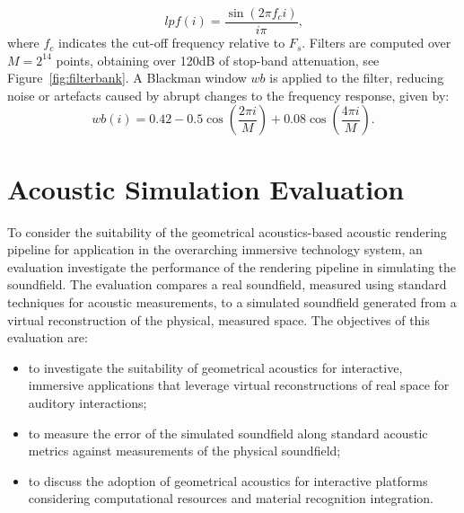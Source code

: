 \begin{equation}
    lpf(i) = \frac{\sin(2\pi f_c i)}{i\pi} \textrm{,}
\end{equation}
where $f_c$ indicates the cut-off frequency relative to $F_s$. Filters are computed over $M = 2^{14}$ points, obtaining over 120dB of stop-band attenuation, see Figure~\ref{fig:filterbank}. A Blackman window $wb$ is applied to the filter, reducing noise or artefacts caused by abrupt changes to the frequency response, given by:
\begin{equation}
    wb(i) = 0.42 - 0.5\cos(\frac{2\pi i}{M}) + 0.08\cos(\frac{4\pi i}{M})\textrm{.}
\end{equation}

\section{Acoustic Simulation Evaluation}
To consider the suitability of the geometrical acoustics-based acoustic rendering pipeline for application in the overarching immersive technology system, an evaluation investigate the performance of the rendering pipeline in simulating the soundfield. The evaluation compares a real soundfield, measured using standard techniques for acoustic measurements, to a simulated soundfield generated from a virtual reconstruction of the physical, measured space. The objectives of this evaluation are:
\begin{itemize}
    \item to investigate the suitability of geometrical acoustics for interactive, immersive applications that leverage virtual reconstructions of real space for auditory interactions;
    \item to measure the error of the simulated soundfield along standard acoustic metrics against measurements of the physical soundfield;
    \item to discuss the adoption of geometrical acoustics for interactive platforms considering computational resources and material recognition integration.
\end{itemize}

